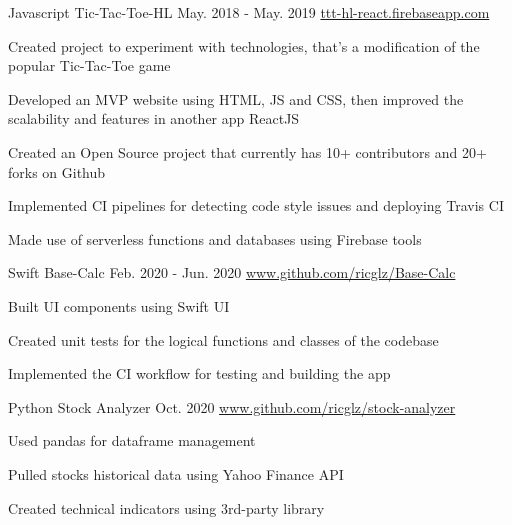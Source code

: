 \begin{cventries}

  \cventry
    {Javascript}
    {Tic-Tac-Toe-HL} %
    {May. 2018 - May. 2019} %
    {\url{ttt-hl-react.firebaseapp.com}} %
    {
      \begin{cvitems} %
        \item {Created project to experiment with technologies, that's a modification of the popular Tic-Tac-Toe game}
        \item {Developed an MVP website using HTML, JS and CSS, then improved the scalability and features in another app ReactJS}
        \item {Created an Open Source project that currently has 10+ contributors and 20+ forks on Github}
        \item {Implemented CI pipelines for detecting code style issues and deploying Travis CI}
        \item {Made use of serverless functions and databases using Firebase tools}
      \end{cvitems}
    }

  \cventry
    {Swift}
    {Base-Calc} %
    {Feb. 2020 - Jun. 2020} %
    {\url{www.github.com/ricglz/Base-Calc}} %
    {
      \begin{cvitems} %
        \item {Built UI components using Swift UI}
        \item {Created unit tests for the logical functions and classes of the codebase}
        \item {Implemented the CI workflow for testing and building the app}
      \end{cvitems}
    }

  \cventry
    {Python}
    {Stock Analyzer} %
    {Oct. 2020} %
    {\url{www.github.com/ricglz/stock-analyzer}} %
    {
      \begin{cvitems} %
        \item {Used pandas for dataframe management}
        \item {Pulled stocks historical data using Yahoo Finance API}
        \item {Created technical indicators using 3rd-party library}
      \end{cvitems}
    }


\end{cventries}
